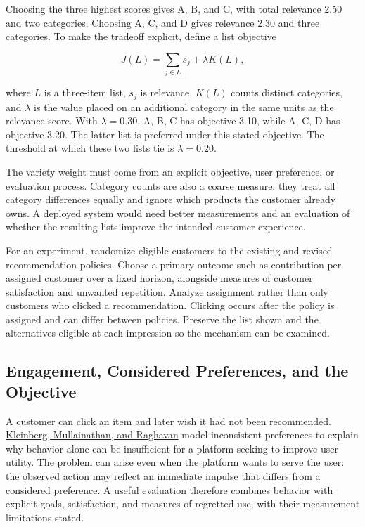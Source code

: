 Choosing the three highest scores gives A, B, and C, with total
relevance 2.50 and two categories. Choosing A, C, and D gives relevance
2.30 and three categories. To make the tradeoff explicit, define a list
objective

\[
J(L)=\sum_{j\in L}s_j+\lambda K(L),
\]

where \(L\) is a three-item list, \(s_j\) is relevance, \(K(L)\) counts
distinct categories, and \(\lambda\) is the value placed on an
additional category in the same units as the relevance score. With
\(\lambda=0.30\), A, B, C has objective 3.10, while A, C, D has
objective 3.20. The latter list is preferred under this stated
objective. The threshold at which these two lists tie is
\(\lambda=0.20\).

The variety weight must come from an explicit objective, user
preference, or evaluation process. Category counts are also a coarse
measure: they treat all category differences equally and ignore which
products the customer already owns. A deployed system would need better
measurements and an evaluation of whether the resulting lists improve
the intended customer experience.

For an experiment, randomize eligible customers to the existing and
revised recommendation policies. Choose a primary outcome such as
contribution per assigned customer over a fixed horizon, alongside
measures of customer satisfaction and unwanted repetition. Analyze
assignment rather than only customers who clicked a recommendation.
Clicking occurs after the policy is assigned and can differ between
policies. Preserve the list shown and the alternatives eligible at each
impression so the mechanism can be examined.

\hypertarget{M08-engagement-considered-preferences-and-the-objective}{%
\subsection{Engagement, Considered Preferences, and the
Objective}\label{M08-engagement-considered-preferences-and-the-objective}}

\noindent A customer can click an item and later wish it had not been recommended.
\href{https://doi.org/10.1287/mnsc.2022.03683}{Kleinberg, Mullainathan,
and Raghavan} model inconsistent preferences to explain why behavior
alone can be insufficient for a platform seeking to improve user
utility. The problem can arise even when the platform wants to serve the
user: the observed action may reflect an immediate impulse that differs
from a considered preference. A useful evaluation therefore combines
behavior with explicit goals, satisfaction, and measures of regretted
use, with their measurement limitations stated.

